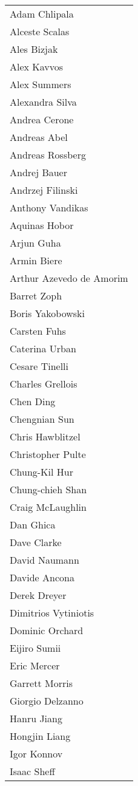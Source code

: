 \begin{tabular}[t]{@{}p{\namewidth}}
Adam Chlipala
\\ Alceste Scalas
\\ Ales Bizjak
\\ Alex Kavvos
\\ Alex Summers
\\ Alexandra Silva
\\ Andrea Cerone
\\ Andreas Abel
\\ Andreas Rossberg
\\ Andrej Bauer
\\ Andrzej Filinski
\\ Anthony Vandikas
\\ Aquinas Hobor
\\ Arjun Guha
\\ Armin Biere
\\ Arthur Azevedo de Amorim
\\ Barret Zoph
\\ Boris Yakobowski
\\ Carsten Fuhs
\\ Caterina Urban
\\ Cesare Tinelli
\\ Charles Grellois
\\ Chen Ding
\\ Chengnian Sun
\\ Chris Hawblitzel
\\ Christopher Pulte
\\ Chung-Kil Hur
\\ Chung-chieh Shan
\\ Craig McLaughlin
\\ Dan Ghica
\\ Dave Clarke
\\ David Naumann
\\ Davide Ancona
\\ Derek Dreyer
\\ Dimitrios Vytiniotis
\\ Dominic Orchard
\\ Eijiro Sumii
\\ Eric Mercer
\\ Garrett Morris
\\ Giorgio Delzanno
\\ Hanru Jiang
\\ Hongjin Liang
\\ Igor Konnov
\\ Isaac Sheff
\end{tabular}%
